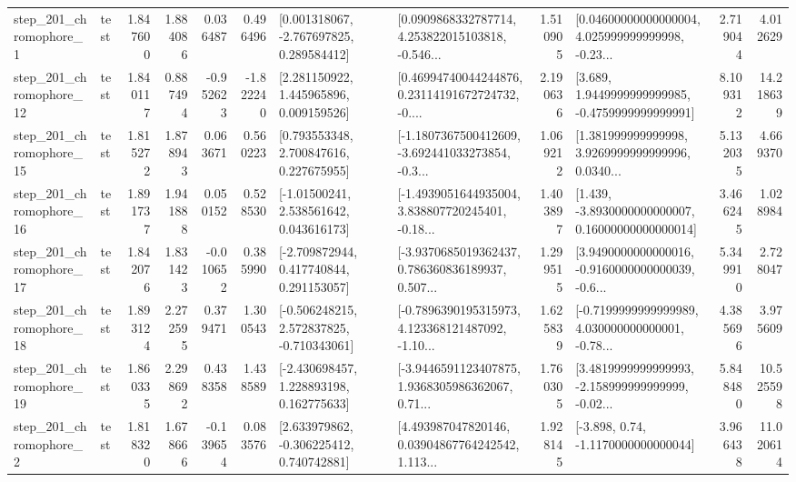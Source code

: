 \begin{tabular}{llrrrrllrlrr}
   step\_201\_chromophore\_1 &      test &      1.847600 &    1.884086 &      0.036487 &  0.496496 &    [0.001318067, -2.767697825, 0.289584412] &  [0.0909868332787714, 4.253822015103818, -0.546... &       1.510905 &  [0.04600000000000004, 4.025999999999998, -0.23... &            2.719044 &          4.012629 \\
  step\_201\_chromophore\_12 &      test &      1.840117 &    0.887494 &     -0.952623 & -1.822240 &     [2.281150922, 1.445965896, 0.009159526] &  [0.46994740044244876, 0.23114191672724732, -0.... &       2.190636 &   [3.689, 1.9449999999999985, -0.4759999999999991] &            8.109312 &         14.218639 \\
  step\_201\_chromophore\_15 &      test &      1.815272 &    1.878943 &      0.063671 &  0.560223 &     [0.793553348, 2.700847616, 0.227675955] &  [-1.1807367500412609, -3.692441033273854, -0.3... &       1.069212 &  [1.381999999999998, 3.9269999999999996, 0.0340... &            5.132035 &          4.669370 \\
  step\_201\_chromophore\_16 &      test &      1.891737 &    1.941888 &      0.050152 &  0.528530 &     [-1.01500241, 2.538561642, 0.043616173] &  [-1.4939051644935004, 3.838807720245401, -0.18... &       1.403897 &  [1.439, -3.8930000000000007, 0.16000000000000014] &            3.466245 &          1.028984 \\
  step\_201\_chromophore\_17 &      test &      1.842076 &    1.831423 &     -0.010652 &  0.385990 &    [-2.709872944, 0.417740844, 0.291153057] &  [-3.9370685019362437, 0.786360836189937, 0.507... &       1.299515 &  [3.9490000000000016, -0.9160000000000039, -0.6... &            5.349910 &          2.728047 \\
  step\_201\_chromophore\_18 &      test &      1.893124 &    2.272595 &      0.379471 &  1.300543 &   [-0.506248215, 2.572837825, -0.710343061] &  [-0.7896390195315973, 4.123368121487092, -1.10... &       1.625839 &  [-0.7199999999999989, 4.030000000000001, -0.78... &            4.385696 &          3.975609 \\
  step\_201\_chromophore\_19 &      test &      1.860335 &    2.298692 &      0.438358 &  1.438589 &    [-2.430698457, 1.228893198, 0.162775633] &  [-3.9446591123407875, 1.9368305986362067, 0.71... &       1.760305 &  [3.4819999999999993, -2.158999999999999, -0.02... &            5.848480 &         10.525598 \\
   step\_201\_chromophore\_2 &      test &      1.818320 &    1.678666 &     -0.139654 &  0.083576 &    [2.633979862, -0.306225412, 0.740742881] &  [4.493987047820146, 0.03904867764242542, 1.113... &       1.928145 &                [-3.898, 0.74, -1.1170000000000044] &            3.966438 &         11.020614 \\

\end{tabular}
